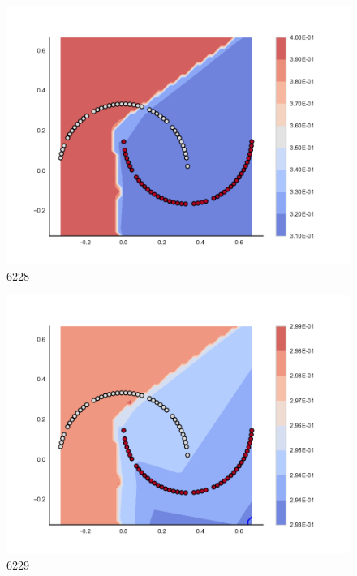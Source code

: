 \begin{subfigure}[b]{0.09\textwidth}
    \includegraphics[clip, trim=2.35cm 1.75cm 4.5cm 0cm,width=\textwidth]{img/convergence/6228.pdf}
    \caption{6228}
    \label{fig:convergence_6228}
\end{subfigure}
%
\begin{subfigure}[b]{0.09\textwidth}
    \includegraphics[clip, trim=2.35cm 1.75cm 4.5cm 0cm,width=\textwidth]{img/convergence/6229.pdf}
    \caption{6229}
    \label{fig:convergence_6229}
\end{subfigure}
%
